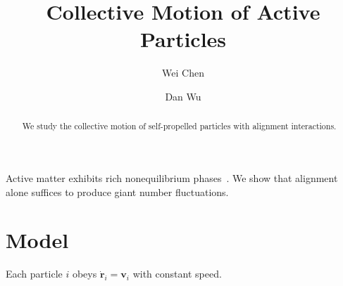 \documentclass[aps,prl,twocolumn,superscriptaddress]{revtex4-2}
\begin{document}
\title{Collective Motion of Active Particles}
\author{Wei Chen}
\author{Dan Wu}
\begin{abstract}
We study the collective motion of self-propelled particles with alignment interactions.
\end{abstract}
\maketitle
Active matter exhibits rich nonequilibrium phases~\cite{smith2020}. We show that
alignment alone suffices to produce giant number fluctuations.
\section{Model}
Each particle $i$ obeys $\dot{\mathbf{r}}_i = \mathbf{v}_i$ with constant speed.


\end{document}
